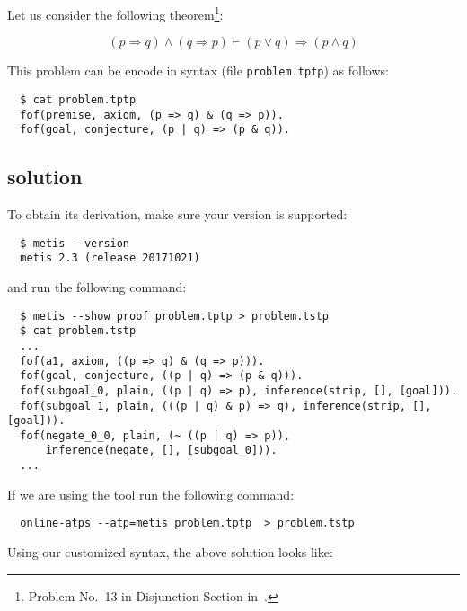 \documentclass[../main.tex]{subfiles}
\begin{document}
\begin{subappendices}
Let us consider the following
theorem\footnote{Problem No.~13 in Disjunction Section in~\cite{Prieto-Cubides2017}.}:

\[
(p \Rightarrow q) \wedge (q \Rightarrow p) ⊢ (p \vee q) \Rightarrow (p \wedge q)
\]

This problem can be encode in \TPTP syntax (file \verb!problem.tptp!) as follows:
\begin{verbatim}
  $ cat problem.tptp
  fof(premise, axiom, (p => q) & (q => p)).
  fof(goal, conjecture, (p | q) => (p & q)).
\end{verbatim}

\subsection{\Metis solution}

To obtain its \Metis derivation, make sure your \Metis version is supported:

\begin{verbatim}
  $ metis --version
  metis 2.3 (release 20171021)
\end{verbatim}

and run the following command:

\begin{verbatim}
  $ metis --show proof problem.tptp > problem.tstp
  $ cat problem.tstp
  ...
  fof(a1, axiom, ((p => q) & (q => p))).
  fof(goal, conjecture, ((p | q) => (p & q))).
  fof(subgoal_0, plain, ((p | q) => p), inference(strip, [], [goal])).
  fof(subgoal_1, plain, (((p | q) & p) => q), inference(strip, [], [goal])).
  fof(negate_0_0, plain, (~ ((p | q) => p)),
      inference(negate, [], [subgoal_0])).
  ...
\end{verbatim}

If we are using the  tool run the following command:

\begin{verbatim}
  online-atps --atp=metis problem.tptp  > problem.tstp
\end{verbatim}

Using our customized \TSTP syntax, the above \Metis solution looks like:


\end{subappendices}
\end{document}
